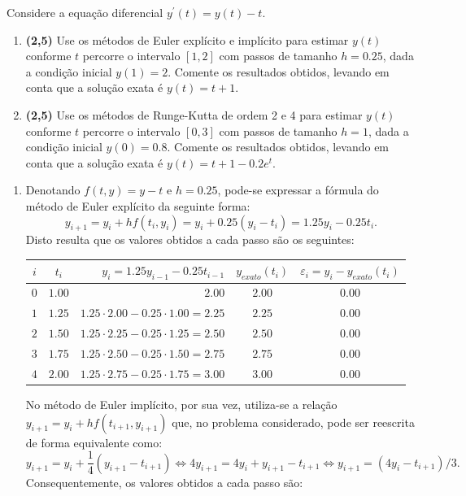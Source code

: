 \documentclass[12pt,a4paper]{article}
\begin{document}
\begin{ExerciseList}
\Exercise%
Considere a equação diferencial $y^\prime(t) = y(t) - t$.
\begin{enumerate}
\item \textbf{(2,5)} Use os métodos de Euler explícito e implícito para estimar $y(t)$ conforme $t$ percorre o intervalo $[1, 2]$ com passos de tamanho $h = 0.25$, dada a condição inicial $y(1) = 2$. Comente os resultados obtidos, levando em conta que a solução exata é $y(t)=t+1$.
\item \textbf{(2,5)} Use os métodos de Runge-Kutta de ordem 2 e 4 para estimar $y(t)$ conforme $t$ percorre o intervalo $[0, 3]$ com passos de tamanho $h = 1$, dada a condição inicial $y(0) = 0.8$. Comente os resultados obtidos, levando em conta que a solução exata é $y(t)=t+1-0.2e^t$.
\end{enumerate}
\Answer
\begin{enumerate}
\item Denotando $f(t,y) = y-t$ e $h=0.25$, pode-se expressar a fórmula do método de Euler explícito da seguinte forma:
\[
y_{i+1}
= y_i + h f(t_i, y_i)
= y_i + 0.25( y_i - t_i )
= 1.25 y_i - 0.25 t_i.
\]
Disto resulta que os valores obtidos a cada passo são os seguintes:
\begin{center}
\begin{tabular}{|c|c|r|c|c|}
\hline
$i$ & $t_i$ & $y_i= 1.25 y_{i-1} - 0.25 t_{i-1}$ & $y_{exato}(t_i)$ & $\varepsilon_i = y_i-y_{exato}(t_i)$ \\ \hline\hline
$0$ & $1.00$ & $2.00$ & $2.00$ & $0.00$ \\ \hline
$1$ & $1.25$ & $1.25 \cdot 2.00 - 0.25 \cdot 1.00 = 2.25$ & $2.25$ & $0.00$ \\ \hline
$2$ & $1.50$ & $1.25 \cdot 2.25 - 0.25 \cdot 1.25= 2.50$ & $2.50$ & $0.00$ \\ \hline
$3$ & $1.75$ & $1.25 \cdot 2.50 - 0.25 \cdot 1.50 = 2.75$ & $2.75$ & $0.00$ \\ \hline
$4$ & $2.00$ & $1.25 \cdot 2.75 - 0.25 \cdot 1.75 = 3.00$ & $3.00$ & $0.00$ \\ \hline
\end{tabular}
\end{center}
No método de Euler implícito, por sua vez, utiliza-se a relação $y_{i+1} = y_i + h f(t_{i+1}, y_{i+1})$ que, no problema considerado, pode ser reescrita  de forma equivalente como:
\[
y_{i+1}
= y_i + \frac{1}{4}( y_{i+1} - t_{i+1} )
\Leftrightarrow
4y_{i+1} = 4y_i + y_{i+1} - t_{i+1}
\Leftrightarrow
y_{i+1} = (4y_i-t_{i+1})/3.
\]
Consequentemente, os valores obtidos a cada passo são:

\end{enumerate}
\end{ExerciseList}
\end{document}
